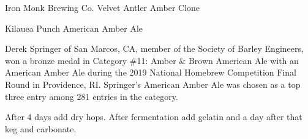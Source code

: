 \begin{recipie}{Iron Monk Brewing Co. Velvet Antler Amber Clone}
\begin{ingredientsblock}
\end{ingredientsblock}

\begin{recipie}{Kilauea Punch American Amber Ale}

\begin{aboutblock}
Derek Springer of San Marcos, CA, member of the Society of Barley Engineers,
won a bronze medal in Category \#11: Amber \& Brown American Ale with an
American Amber Ale during the 2019 National Homebrew Competition Final Round
in Providence, RI. Springer's American Amber Ale was chosen as a top three
entry among 281 entries in the category. \sourceaha
\end{aboutblock}


\begin{methodandtiming}
 
\begin{mashsteps}
\end{mashsteps}

\begin{fermentationsteps}
\end{fermentationsteps}

\begin{directions}
After 4 days add dry hops. After fermentation add gelatin and a day after that
keg and carbonate.
\end{directions}

\end{methodandtiming}

\pagebreak

\begin{ingredientsblock}

\begin{malts}
\end{malts}


\end{ingredientsblock}
\end{recipie}
\end{recipie}
